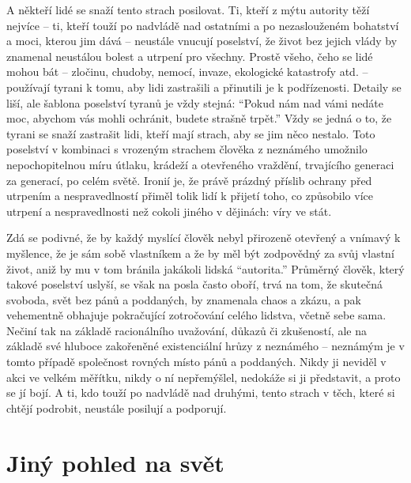 \documentclass{book}
\begin{document}
A někteří lidé se snaží tento strach posilovat. Ti, kteří z mýtu autority těží nejvíce -- ti, kteří touží po nadvládě nad ostatními a po nezaslouženém bohatství a moci, kterou jim dává -- neustále vnucují poselství, že život bez jejich vlády by znamenal neustálou bolest a utrpení pro všechny. Prostě všeho, čeho se lidé mohou bát -- zločinu, chudoby, nemocí, invaze, ekologické katastrofy atd. -- používají tyrani k tomu, aby lidi zastrašili a přinutili je k podřízenosti. Detaily se liší, ale šablona poselství tyranů je vždy stejná: \enquote{Pokud nám nad vámi nedáte moc, abychom vás mohli ochránit, budete strašně trpět.} Vždy se jedná o to, že tyrani se snaží zastrašit lidi, kteří mají strach, aby se jim něco nestalo. Toto poselství v kombinaci s vrozeným strachem člověka z neznámého umožnilo nepochopitelnou míru útlaku, krádeží a otevřeného vraždění, trvajícího generaci za generací, po celém světě. Ironií je, že právě prázdný příslib ochrany před utrpením a nespravedlností přiměl tolik lidí k přijetí toho, co způsobilo více utrpení a nespravedlnosti než cokoli jiného v dějinách: víry ve stát.

Zdá se podivné, že by každý myslící člověk nebyl přirozeně otevřený a vnímavý k myšlence, že je sám sobě vlastníkem a že by měl být zodpovědný za svůj vlastní život, aniž by mu v tom bránila jakákoli lidská \enquote{autorita.} Průměrný člověk, který takové poselství uslyší, se však na posla často oboří, trvá na tom, že skutečná svoboda, svět bez pánů a poddaných, by znamenala chaos a zkázu, a pak vehementně obhajuje pokračující zotročování celého lidstva, včetně sebe sama. Nečiní tak na základě racionálního uvažování, důkazů či zkušeností, ale na základě své hluboce zakořeněné existenciální hrůzy z neznámého -- neznámým je v tomto případě společnost rovných místo pánů a poddaných. Nikdy ji neviděl v akci ve velkém měřítku, nikdy o ní nepřemýšlel, nedokáže si ji představit, a proto se jí bojí. A ti, kdo touží po nadvládě nad druhými, tento strach v těch, které si chtějí podrobit, neustále posilují a podporují.

\section{Jiný pohled na svět}
\end{document}
